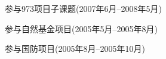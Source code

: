 
\begin{archivements}{99}
    \item 参与973项目子课题(2007年6月--2008年5月)
    \item 参与自然基金项目(2005年5月--2005年8月)
    \item 参与国防项目(2005年8月--2005年10月)
\end{archivements}
